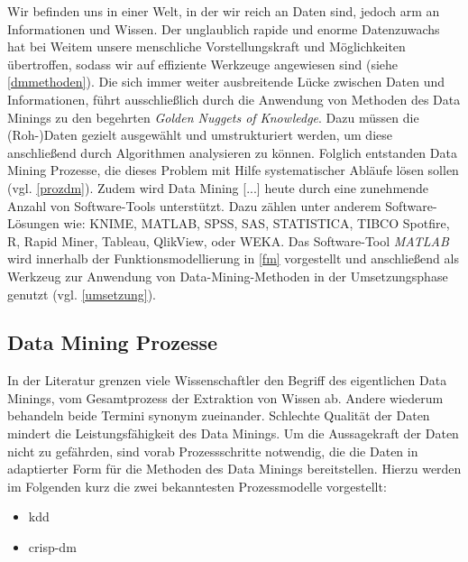 \glqq Wir befinden uns in einer Welt, in der wir reich an Daten sind, jedoch arm an Informationen und Wissen.\grqq{} Der unglaublich rapide und enorme Datenzuwachs hat bei Weitem unsere menschliche Vorstellungskraft und Möglichkeiten übertroffen, sodass wir auf effiziente Werkzeuge angewiesen sind (siehe \vref{dmmethoden}). Die sich immer weiter ausbreitende Lücke zwischen Daten und Informationen, führt ausschließlich durch die Anwendung von Methoden des Data Minings zu den begehrten \glqq \textit{Golden Nuggets of Knowledge}\grqq. Dazu müssen die (Roh-)Daten gezielt ausgewählt und umstrukturiert werden, um diese anschließend durch Algorithmen analysieren zu können. Folglich entstanden Data Mining Prozesse, die dieses Problem mit Hilfe systematischer Abläufe lösen sollen (vgl. \vref{prozdm}). Zudem wird \glqq Data Mining [...] heute durch eine zunehmende Anzahl von Software-Tools unterstützt. Dazu zählen unter anderem Software-Lösungen wie: KNIME, MATLAB, SPSS, SAS, STATISTICA, TIBCO Spotfire, R, Rapid Miner, Tableau, QlikView, oder WEKA.\grqq{} Das Software-Tool \textit{MATLAB} wird innerhalb der Funktionsmodellierung in \vref{fm} vorgestellt und anschließend als Werkzeug zur Anwendung von Data-Mining-Methoden in der Umsetzungsphase genutzt (vgl. \vref{umsetzung}).


\subsection{Data Mining Prozesse}
\label{prozdm}

In der Literatur grenzen viele Wissenschaftler den Begriff des eigentlichen Data Minings, vom Gesamtprozess der Extraktion von Wissen ab. Andere wiederum behandeln beide Termini synonym zueinander. Schlechte Qualität der Daten mindert die Leistungsfähigkeit des Data Minings. Um die Aussagekraft der Daten nicht zu gefährden, sind vorab Prozessschritte notwendig, die die Daten in adaptierter Form für die Methoden des Data Minings bereitstellen. Hierzu werden im Folgenden kurz die zwei bekanntesten Prozessmodelle vorgestellt:

\begin{itemize}
\item \gls{kdd}
\item \gls{crisp-dm}
\end{itemize}

